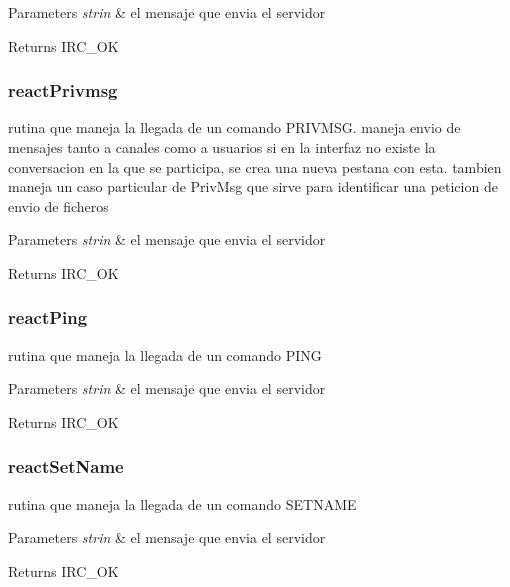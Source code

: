 \begin{DoxyParams}{Parameters}
{\em strin} & el mensaje que envia el servidor\\
\hline
\end{DoxyParams}
\begin{DoxyReturn}{Returns}
I\-R\-C\-\_\-\-O\-K
\end{DoxyReturn}


 \hypertarget{reactPrivmsg}{}\subsubsection{react\-Privmsg}\label{reactPrivmsg}
rutina que maneja la llegada de un comando P\-R\-I\-V\-M\-S\-G. maneja envio de mensajes tanto a canales como a usuarios si en la interfaz no existe la conversacion en la que se participa, se crea una nueva pestana con esta. tambien maneja un caso particular de Priv\-Msg que sirve para identificar una peticion de envio de ficheros


\begin{DoxyParams}{Parameters}
{\em strin} & el mensaje que envia el servidor\\
\hline
\end{DoxyParams}
\begin{DoxyReturn}{Returns}
I\-R\-C\-\_\-\-O\-K
\end{DoxyReturn}


 \hypertarget{reactPing}{}\subsubsection{react\-Ping}\label{reactPing}
rutina que maneja la llegada de un comando P\-I\-N\-G


\begin{DoxyParams}{Parameters}
{\em strin} & el mensaje que envia el servidor\\
\hline
\end{DoxyParams}
\begin{DoxyReturn}{Returns}
I\-R\-C\-\_\-\-O\-K
\end{DoxyReturn}


 \hypertarget{reactSetName}{}\subsubsection{react\-Set\-Name}\label{reactSetName}
rutina que maneja la llegada de un comando S\-E\-T\-N\-A\-M\-E


\begin{DoxyParams}{Parameters}
{\em strin} & el mensaje que envia el servidor\\
\hline
\end{DoxyParams}
\begin{DoxyReturn}{Returns}
I\-R\-C\-\_\-\-O\-K
\end{DoxyReturn}


